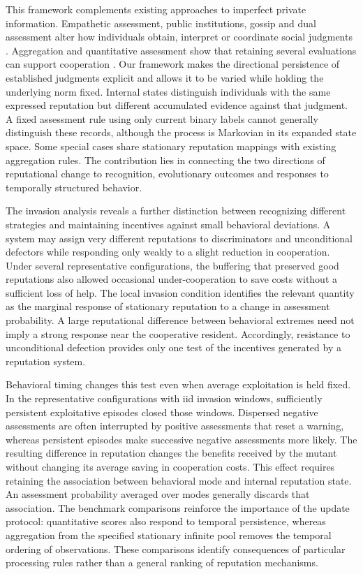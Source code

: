 \documentclass[fleqn,10pt]{wlscirep}
\begin{document}
This framework complements existing approaches to imperfect private
information. Empathetic assessment, public institutions, gossip and
dual assessment alter how individuals obtain, interpret or coordinate
social judgments
\cite{radzvilavicius2019,radzvilavicius2021,kawakatsu2024,tham2026}.
Aggregation and quantitative assessment show that retaining several
evaluations can support cooperation
\cite{michelmata2024,schmid2023}.
Our framework makes the directional persistence of established
judgments explicit and allows it to be varied while holding the
underlying norm fixed. Internal states distinguish individuals with
the same expressed reputation but different accumulated evidence
against that judgment. A fixed assessment rule using only current
binary labels cannot generally distinguish these records, although
the process is Markovian in its expanded state space. Some special
cases share stationary reputation mappings with existing aggregation
rules. The contribution lies in connecting the two directions of
reputational change to recognition, evolutionary outcomes and
responses to temporally structured behavior.

The invasion analysis reveals a further distinction between
recognizing different strategies and maintaining incentives against
small behavioral deviations. A system may assign very different
reputations to discriminators and unconditional defectors while
responding only weakly to a slight reduction in cooperation.
Under several representative configurations, the buffering that
preserved good reputations also allowed occasional under-cooperation
to save costs without a sufficient loss of help. The local invasion
condition identifies the relevant quantity as the marginal response
of stationary reputation to a change in assessment probability.
A large reputational difference between behavioral extremes need
not imply a strong response near the cooperative resident.
Accordingly, resistance to unconditional defection provides only
one test of the incentives generated by a reputation system.

Behavioral timing changes this test even when average exploitation
is held fixed. In the representative configurations with iid invasion
windows, sufficiently persistent exploitative episodes closed those
windows. Dispersed negative assessments are often interrupted by
positive assessments that reset a warning, whereas persistent
episodes make successive negative assessments more likely.
The resulting difference in reputation changes the benefits received
by the mutant without changing its average saving in cooperation
costs. This effect requires retaining the association between
behavioral mode and internal reputation state. An assessment
probability averaged over modes generally discards that association.
The benchmark comparisons reinforce the importance of the update
protocol: quantitative scores also respond to temporal persistence,
whereas aggregation from the specified stationary infinite pool
removes the temporal ordering of observations. These comparisons
identify consequences of particular processing rules rather than
a general ranking of reputation mechanisms.
\end{document}
